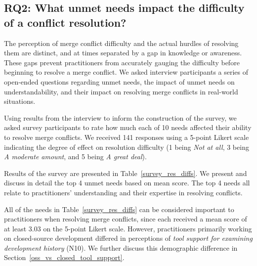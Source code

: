 \subsection{\textbf{RQ2:} What unmet needs impact the difficulty of a conflict resolution?}\label{RQ2}

The perception of merge conflict difficulty and the actual hurdles of resolving them are distinct, and at times separated by a gap in knowledge or awareness.
These gaps prevent practitioners from accurately gauging the difficulty before beginning to resolve a merge conflict.
We asked interview participants a series of open-ended questions regarding unmet needs, the impact of unmet needs on understandability, and their impact on resolving merge conflicts in real-world situations.

Using results from the interview to inform the construction of the survey, we asked survey participants to rate how much each of 10 needs affected their ability to resolve merge conflicts.
We received 141 responses using a 5-point Likert scale indicating the degree of effect on resolution difficulty (1 being \textit{Not at all}, 3 being \textit{A moderate amount}, and 5 being \textit{A great deal}).

Results of the survey are presented in Table~\ref{survey_res_diffs}.
We present and discuss in detail the top 4 unmet needs based on mean score.
The top 4 needs all relate to practitioners' understanding and their expertise in resolving conflicts. 

All of the needs in Table~\ref{survey_res_diffs} can be considered important to practitioners when resolving merge conflicts, since each received a mean score of at least 3.03 on the 5-point Likert scale.
However, practitioners primarily working on closed-source development differed in perceptions of \textit{tool support for examining development history} (N10).
We further discuss this demographic difference in Section~\ref{oss_vs_closed_tool_support}.

